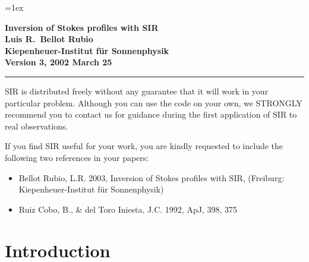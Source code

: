 
\def\d{{\rm d}}
\def\vec#1{\mbox{\boldmath $ #1$}}
\def\tens#1{\ifmmode\mathchoice{\mbox{$\sf\displaystyle#1$}}
{\mbox{$\sf\textstyle#1$}}
{\mbox{$\sf\scriptstyle#1$}}
{\mbox{$\sf\scriptscriptstyle#1$}}\else
\hbox{$\sf\textstyle#1$}\fi}



\oddsidemargin=0.1in
\topmargin=0in
\textheight=21.5cm
\textwidth=15.5cm
\parskip=1ex


 


\thispagestyle{empty}
\vspace*{3cm}
\begin{center}
\Huge \bf Inversion of Stokes profiles with SIR \\
\vspace*{2cm}
\Large Luis R.\ Bellot Rubio \\
Kiepenheuer-Institut f\"ur Sonnenphysik \\
\vspace*{.5cm}
\normalsize
Version 3, 2002 March 25
\end{center}

\clearpage
\vspace*{\fill}

\hrule
\vspace*{1em}
\noindent SIR is distributed freely without any guarantee that it will work 
in your particular problem. Although you can use the code on your 
own, we STRONGLY recommend you to contact us for guidance during 
the first application of SIR to real observations.

\noindent If you find SIR useful for your work, you are kindly requested
to include the following two references in your papers:

\begin{itemize}
\item Bellot Rubio, L.R. 2003, Inversion of Stokes profiles with SIR, 
  (Freiburg: Kiepenheuer-Institut f\"ur Sonnenphysik)
\item Ruiz Cobo, B., \& del Toro Iniesta, J.C. 1992, ApJ, 398, 375 
\end{itemize}

\thispagestyle{empty}
\clearpage

\tableofcontents

\chapter{Introduction}

